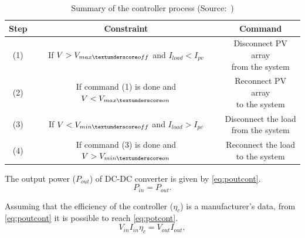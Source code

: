 \documentclass[journal]{IEEEtran}
\begin{document}
\begin{table}[!t]
\renewcommand{\arraystretch}{1.3}
\caption{Summary of the controller process (Source:~\cite{Hansen})}
\label{table:controller}
\centering
\begin{tabular}{c | c | c }
\hline
\hline
Step  & Constraint & Command\\
\hline
\hline
(1) & \makecell{If $V > V_{max \textunderscore off}$ \\and $I_{load} < I_{pv}$} & \makecell{Disconnect PV array \\from the system}\\
\hline
(2) & \makecell{If command (1) is \\done and $V < V_{max \textunderscore on}$} & \makecell{Reconnect PV array \\to the system}\\
\hline
(3) & \makecell{If $V < V_{min \textunderscore off}$ and \\ $I_{load} > I_{pv}$} & \makecell{Disconnect the load \\from the system}\\
\hline
(4) & \makecell{If command (3) is \\ done and $V > V_{min \textunderscore on}$} & \makecell{Reconnect the load \\to the system}\\
\hline
\hline
\end{tabular}
\end{table}

%
The output power ($ P_{out} $) of DC-DC converter is given by \eqref{eq:poutcont}. 
\begin{equation}
\label{eq:poutcont}
P_{in} = P_{out}.
\end{equation}

Assuming that the efficiency of the controller ($ \eta_{c} $) is a manufacturer's data, from \eqref{eq:poutcont} it is possible to reach \eqref{eq:potcont}.
\begin{equation}
\label{eq:potcont}
V_{in} I_{in} \eta_{c} = V_{out} I_{out},
\end{equation}
\end{document}
